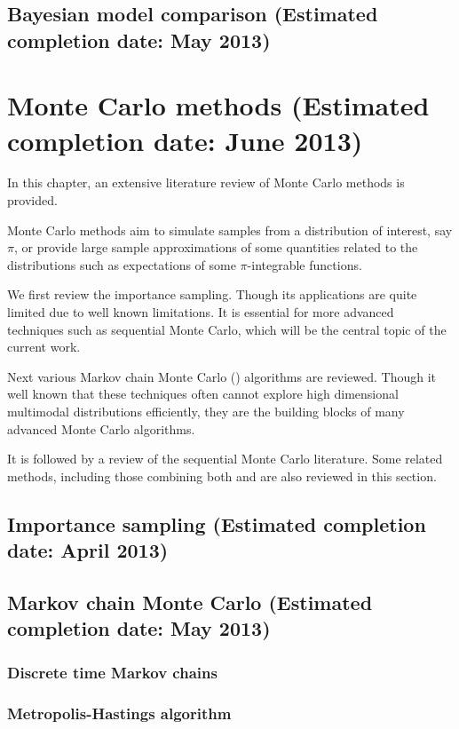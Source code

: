 \documentclass[11pt, fontset = Minion]{marticle}
\def\finish#1{(Estimated completion date: #1 2013)}
\begin{document}
\subsection{Bayesian model comparison \finish{May}}

\section{Monte Carlo methods \finish{June}}

In this chapter, an extensive literature review of Monte Carlo methods is
provided.

Monte Carlo methods aim to simulate samples from a distribution of interest,
say $\pi$, or provide large sample approximations of some quantities related
to the distributions such as expectations of some $\pi$-integrable functions.

We first review the importance sampling. Though its applications are quite
limited due to well known limitations. It is essential for more advanced
techniques such as sequential Monte Carlo, which will be the central topic of
the current work.

Next various Markov chain Monte Carlo (\mcmc) algorithms are reviewed. Though
it well known that these techniques often cannot explore high dimensional
multimodal distributions efficiently, they are the building blocks of many
advanced Monte Carlo algorithms.

It is followed by a review of the sequential Monte Carlo literature. Some
related methods, including those combining both \smc and \mcmc are also
reviewed in this section.

\subsection{Importance sampling \finish{April}}

\subsection{Markov chain Monte Carlo \finish{May}}

\subsubsection{Discrete time Markov chains}

\subsubsection{Metropolis-Hastings algorithm}
\end{document}

